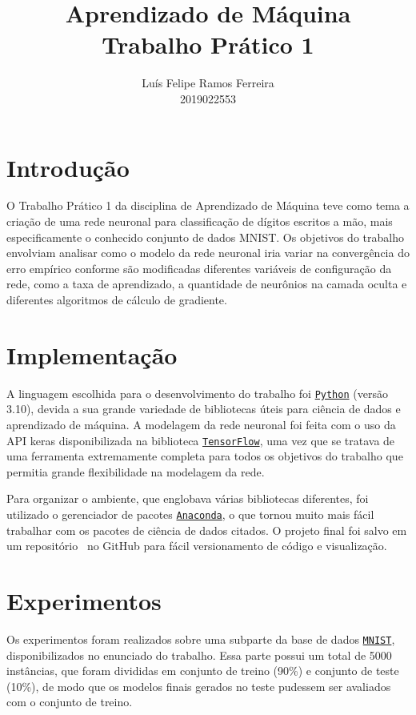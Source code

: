 \documentclass{article}
\title{Aprendizado de Máquina \\ Trabalho Prático 1}
\author{Luís Felipe Ramos Ferreira \\ 2019022553}
\begin{document}
\maketitle

\section{Introdução}

O Trabalho Prático 1 da disciplina de Aprendizado de Máquina teve como tema a criação de uma rede neuronal para classificação de dígitos escritos a mão, mais especificamente o conhecido conjunto de dados MNIST. Os objetivos do trabalho envolviam analisar como o modelo da rede neuronal iria variar na convergência do erro empírico conforme são modificadas diferentes variáveis de configuração da rede, como a taxa de aprendizado, a quantidade de neurônios na camada oculta e diferentes algoritmos de cálculo de gradiente.

\section{Implementação}

A linguagem escolhida para o desenvolvimento do trabalho foi \href{https://www.python.org/}{\texttt{Python}} (versão 3.10), devida a sua grande variedade de bibliotecas úteis para ciência de dados e aprendizado de máquina. A modelagem da rede neuronal foi feita com o uso da API keras disponibilizada na biblioteca \href{https://www.tensorflow.org/}{\texttt{TensorFlow}}, uma vez que se tratava de uma ferramenta extremamente completa para todos os objetivos do trabalho que permitia grande flexibilidade na modelagem da rede.

Para organizar o ambiente, que englobava várias bibliotecas diferentes, foi utilizado o gerenciador de pacotes \href{https://www.anaconda.com/}{\texttt{Anaconda}}, o que tornou muito mais fácil trabalhar com os pacotes de ciência de dados citados. O projeto final foi salvo em um repositório~\cite{Ramos_Ferreira_MNIST-MLP_2022} no GitHub
para fácil versionamento de código e visualização.

\section{Experimentos}

Os experimentos foram realizados sobre uma subparte da base de dados \href{https://en.wikipedia.org/wiki/MNIST_database#:~:text=The%20MNIST%20database%20(Modified%20National,the%20field%20of%20machine%20learning.}{\texttt{MNIST}}, disponibilizados no enunciado do trabalho. Essa parte possui um total de 5000 instâncias, que foram divididas em conjunto de treino (90\%) e conjunto de teste (10\%), de modo
que os modelos finais gerados no teste pudessem ser avaliados com o conjunto de treino.
\end{document}
